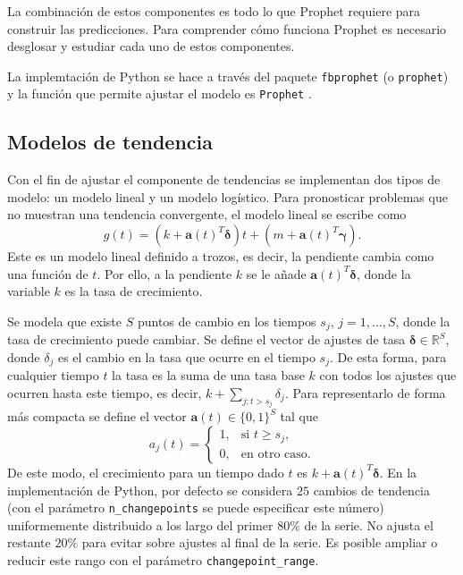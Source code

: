 \documentclass[12pt,twoside]{article}
\begin{document}
La combinación de estos componentes es todo lo que Prophet requiere para construir las predicciones. Para comprender cómo funciona Prophet es necesario desglosar y estudiar cada uno de estos componentes.

La implemtación de Python se hace a través del paquete \texttt{fbprophet} (o \texttt{prophet}) y la función que permite ajustar el modelo es \texttt{Prophet} \cite{Prophet2}.

\subsection{Modelos de tendencia}
Con el fin de ajustar el componente de tendencias se implementan dos tipos de modelo: un modelo lineal y un modelo logístico. Para pronosticar problemas que no muestran una tendencia convergente, el modelo lineal se escribe como
\begin{equation} \label{eq:prophet:g_lineal}
    g(t) = (k+\mathbf{a}(t)^T \boldsymbol{\delta})t + (m + \mathbf{a}(t)^T\boldsymbol{\gamma}).
\end{equation}
Este es un modelo lineal definido a trozos, es decir, la pendiente cambia como una función de $t$. Por ello, a la pendiente $k$ se le añade $\mathbf{a}(t)^T\boldsymbol{\delta}$, donde la variable $k$ es la tasa de crecimiento. 

Se modela que existe $S$ puntos de cambio en los tiempos $s_j$, $j=1,\dotsc, S$, donde la tasa de crecimiento puede cambiar. Se define el vector de ajustes de tasa $\boldsymbol{\delta}\in \mathbb{R}^S$, donde $\delta_j$ es el cambio en la tasa que ocurre en el tiempo $s_j$. De esta forma, para cualquier tiempo $t$ la tasa es la suma de una tasa base $k$ con todos los ajustes que ocurren hasta este tiempo, es decir, $k + \sum_{j: t>s_j} \delta_j$. Para representarlo de forma más compacta se define el vector $\mathbf{a}(t)\in \{0, 1\}^S$ tal que
\begin{equation*}
    a_j(t) = \left\{ \begin{array}{ll}
        1, & \text{si } t\geq s_j,  \\
        0, & \text{en otro caso.}
    \end{array}\right.
\end{equation*}
De este modo, el crecimiento para un tiempo dado $t$ es $k + \mathbf{a}(t)^T \boldsymbol{\delta}$. En la implementación de Python, por defecto se considera $25$ cambios de tendencia (con el parámetro \texttt{n\_changepoints} se puede especificar este número) uniformemente distribuido a los largo del primer $80\%$ de la serie. No ajusta el restante $20\%$ para evitar sobre ajustes al final de la serie. Es posible ampliar o reducir este rango con el parámetro \texttt{changepoint\_range}.
\end{document}
